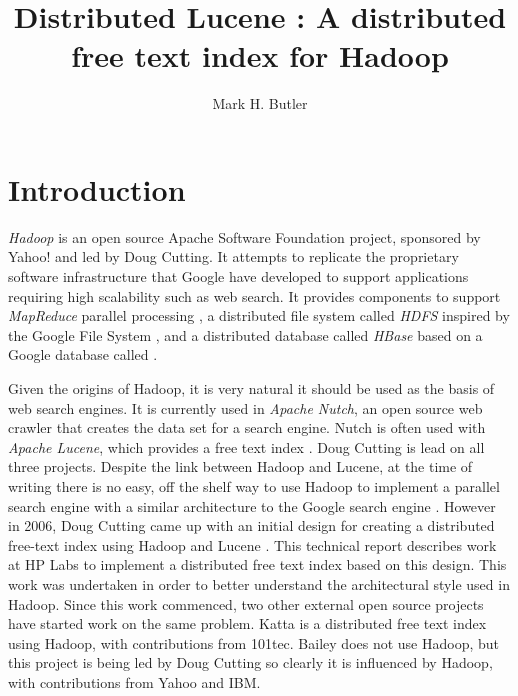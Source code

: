 \documentclass[a4paper,10pt]{article}
\title{Distributed Lucene : A distributed free text index for Hadoop}
\author{Mark H. Butler}
\begin{document}
\maketitle

\begin{abstract}

\end{abstract}

\section{Introduction}
\emph{Hadoop} is an open source Apache Software Foundation project, sponsored by Yahoo!\cite{hadoop} and led by Doug Cutting. It attempts to replicate the proprietary software infrastructure that Google have developed to support applications requiring high scalability such as web search. It provides components to support \emph{MapReduce} parallel processing \cite{citeulike:430834}, a distributed file system called \emph{HDFS} inspired by the Google File System \cite{citeulike:300020}, and a distributed database called \emph{HBase} based on a Google database called \cite{citeulike:2259592}. 

Given the origins of Hadoop, it is very natural it should be used as the basis of web search engines. It is currently used in \emph{Apache Nutch}, an open source web crawler that creates the data set for a search engine. Nutch is often used with \emph{Apache Lucene}, which provides a free text index \cite{lucene}. Doug Cutting is lead on all three projects. Despite the link between Hadoop and Lucene, at the time of writing there is no easy, off the shelf way to use Hadoop to implement a parallel search engine with a similar architecture to the Google search engine \cite{barroso2003}. However in 2006, Doug Cutting came up with an initial design for creating a distributed free-text index using Hadoop and Lucene \cite{cutting2006}. This technical report describes work at HP Labs to implement a distributed free text index based on this design. This work was undertaken in order to better understand the architectural style used in Hadoop. Since this work commenced, two other external open source projects have started work on the same problem. Katta \cite{katta} is a distributed free text index using Hadoop, with contributions from 101tec. Bailey \cite{bailey} does not use Hadoop, but this project is being led by Doug Cutting so clearly it is influenced by Hadoop, with contributions from Yahoo and IBM. 
\end{document}
